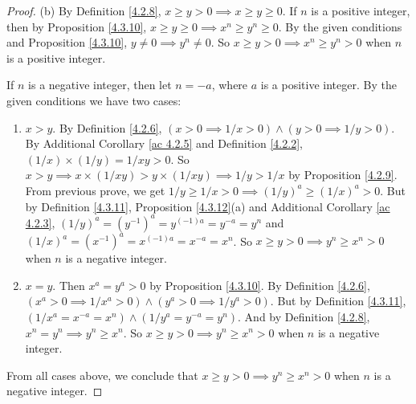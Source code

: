\begin{proof}{(b)}
    By Definition \ref{4.2.8}, \(x \geq y > 0 \implies x \geq y \geq 0\).
    If \(n\) is a positive integer, then by Proposition \ref{4.3.10}, \(x \geq y \geq 0 \implies x^n \geq y^n \geq 0\).
    By the given conditions and Proposition \ref{4.3.10}, \(y \neq 0 \implies y^n \neq 0\).
    So \(x \geq y > 0 \implies x^n \geq y^n > 0\) when \(n\) is a positive integer.

    If \(n\) is a negative integer, then let \(n = -a\), where \(a\) is a positive integer.
    By the given conditions we have two cases:
    \begin{enumerate}[label=(\roman*)]
        \item \(x > y\).
              By Definition \ref{4.2.6}, \((x > 0 \implies 1 / x > 0) \land (y > 0 \implies 1 / y > 0)\).
              By Additional Corollary \ref{ac 4.2.5} and Definition \ref{4.2.2}, \((1 / x) \times (1 / y) = 1 / xy > 0\).
              So \(x > y \implies x \times (1 / xy) > y \times (1 / xy) \implies 1 / y > 1 / x\) by Proposition \ref{4.2.9}.
              From previous prove, we get \(1 / y \geq 1 / x > 0 \implies (1 / y)^a \geq (1 / x)^a > 0\).
              But by Definition \ref{4.3.11}, Proposition \ref{4.3.12}(a) and Additional Corollary \ref{ac 4.2.3}, \((1 / y)^a = (y^{-1})^a = y^{(-1)a} = y^{-a} = y^n\) and \((1 / x)^a = (x^{-1})^a = x^{(-1)a} = x^{-a} = x^n\).
              So \(x \geq y > 0 \implies y^n \geq x^n > 0\) when \(n\) is a negative integer.
        \item \(x = y\).
              Then \(x^a = y^a > 0\) by Proposition \ref{4.3.10}.
              By Definition \ref{4.2.6}, \((x^a > 0 \implies 1 / x^a > 0) \land (y^a > 0 \implies 1 / y^a > 0)\).
              But by Definition \ref{4.3.11}, \((1 / x^a = x^{-a} = x^n) \land (1 / y^a = y^{-a} = y^n)\).
              And by Definition \ref{4.2.8}, \(x^n = y^n \implies y^n \geq x^n\).
              So \(x \geq y > 0 \implies y^n \geq x^n > 0\) when \(n\) is a negative integer.
    \end{enumerate}
    From all cases above, we conclude that \(x \geq y > 0 \implies y^n \geq x^n > 0\) when \(n\) is a negative integer.
\end{proof}

